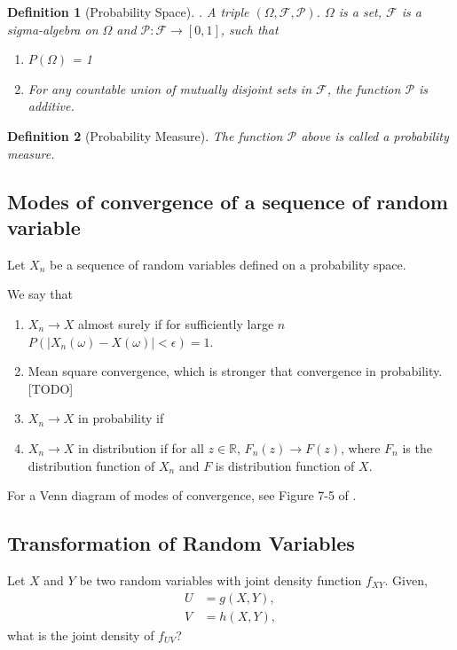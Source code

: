 \documentclass{amsart}
\theoremstyle{plain}
\newtheorem{definition}{Definition}
\numberwithin{equation}{section}
\begin{document}
\begin{definition}[Probability Space]. 
A triple $(\Omega, \mathcal{F}, \mathcal{P})$.
$\Omega$ is a set, $\mathcal{F}$ is a sigma-algebra
on $\Omega$ and $\mathcal{P}: \mathcal{F} \to [0, 1]$,
such that 
\begin{enumerate}
	\item $P(\Omega)$ = 1
	\item For any countable union of mutually disjoint sets in $\mathcal{F}$, the 
	function $\mathcal{P}$ is additive.
\end{enumerate}
\end{definition}
\begin{definition}[Probability Measure]
The function $\mathcal{P}$ above is called a probability measure.
\end{definition}

\subsection{Modes of convergence of a sequence of random variable}
Let $X_n$ be a sequence of random variables defined on a probability 
space. 

We say that 
\begin{enumerate}
\item $X_n \to X$ almost surely 
if for sufficiently large $n$
$P(|X_n(\omega)-X(\omega)| < \epsilon) = 1$.

\item Mean square convergence, which is 
stronger that convergence in probability. 
[TODO]


\item $X_n \to X$ in probability 
if 

\item $X_n \to X$ in distribution
if for all $z \in \mathbb{R}$, 
$F_n(z) \to F(z)$, where
$F_n$ is the distribution function of 
$X_n$ and $F$ is distribution function 
of $X$.


\end{enumerate}

For a Venn diagram of modes of convergence, 
see Figure 7-5 of \cite{papoulis2002probability}.

\subsection{Transformation of Random Variables}
Let $X$ and $Y$ be two random variables with joint 
density function $f_{XY}$. Given,
\begin{align*}
U &= g(X, Y),\\
V &= h(X, Y),
\end{align*}
what is the joint density of $f_{UV}$?
\end{document}
